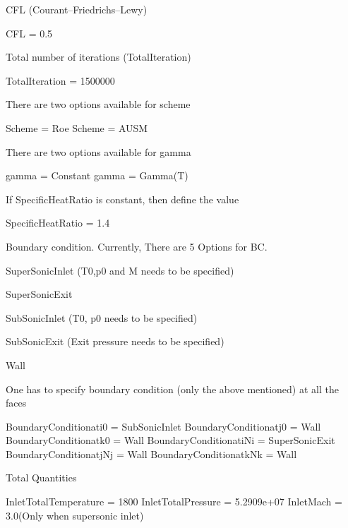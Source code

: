\begin{DoxyEnumerate}
\item C\+FL (Courant–\+Friedrichs–\+Lewy) \begin{DoxyVerb} CFL = 0.5
\end{DoxyVerb}

\item Total number of iterations (Total\+Iteration) \begin{DoxyVerb} TotalIteration = 1500000
\end{DoxyVerb}

\item There are two options available for scheme \begin{DoxyVerb} Scheme = Roe
 Scheme = AUSM
\end{DoxyVerb}

\item There are two options available for gamma \begin{DoxyVerb} gamma = Constant
 gamma = Gamma(T)
\end{DoxyVerb}

\item If Specific\+Heat\+Ratio is constant, then define the value \begin{DoxyVerb} SpecificHeatRatio = 1.4
\end{DoxyVerb}

\item Boundary condition. Currently, There are 5 Options for BC.
\begin{DoxyEnumerate}
\item Super\+Sonic\+Inlet (T0,p0 and M needs to be specified)
\item Super\+Sonic\+Exit
\item Sub\+Sonic\+Inlet (T0, p0 needs to be specified)
\item Sub\+Sonic\+Exit (Exit pressure needs to be specified)
\item Wall
\end{DoxyEnumerate}
\item One has to specify boundary condition (only the above mentioned) at all the faces \begin{DoxyVerb}BoundaryConditionati0 = SubSonicInlet
BoundaryConditionatj0 = Wall
BoundaryConditionatk0 = Wall
BoundaryConditionatiNi = SuperSonicExit
BoundaryConditionatjNj = Wall
BoundaryConditionatkNk = Wall
\end{DoxyVerb}

\item Total Quantities \begin{DoxyVerb} InletTotalTemperature = 1800
 InletTotalPressure = 5.2909e+07
 InletMach = 3.0(Only when supersonic inlet)
\end{DoxyVerb}


\end{DoxyEnumerate}
